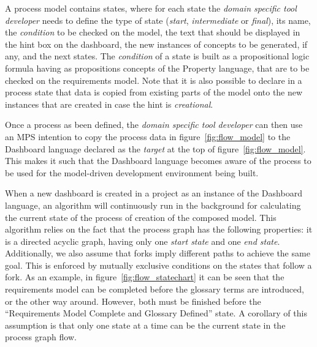 A process model contains states, where for each state the  \emph{domain
specific tool developer} needs to define the type of state (\emph{start},
\emph{intermediate} or \emph{final}), its name, the \emph{condition} to be
checked on the model, the text that should be displayed in the hint box on the
dashboard, the new instances of concepts to be generated, if any, and the next
states. The \emph{condition} of a state is built as a propositional logic
formula having as propositions concepts of the \textsf{Property} language, that are to
be checked on the requirements model. Note that it is also possible to declare in a process
state that data is copied from existing parts of the model onto the new
instances that are created in case the hint is \emph{creational}.

Once a process as been defined, the \emph{domain specific tool developer} can
then use an MPS intention to copy the process data in
figure~\ref{fig:flow_model} to the \textsf{Dashboard} language declared as the
\emph{target} at the top of figure~\ref{fig:flow_model}. This makes it such that
the \textsf{Dashboard} language becomes aware of the process to be used for the
model-driven development environment being built.

When a new dashboard is created in a project as an instance of the
\textsf{Dashboard} language, an algorithm will continuously run in the
background for calculating the current state of the process of creation of the composed model.
This algorithm relies on the fact that the process graph has the following
properties: it is a directed acyclic graph, having only one \emph{start state}
and one \emph{end state}. Additionally, we also assume that forks imply
different paths to achieve the same goal. This is enforced by mutually
exclusive conditions on the  states that follow a fork. As an example, in
figure~\ref{fig:flow_statechart} it can be seen that the requirements model can be completed before the glossary terms are introduced, or
the other way around. However, both must be finished before the ``Requirements
Model Complete and Glossary Defined'' state. A corollary of this assumption 
is that only one state at a time can be the current state in the process
graph flow.

